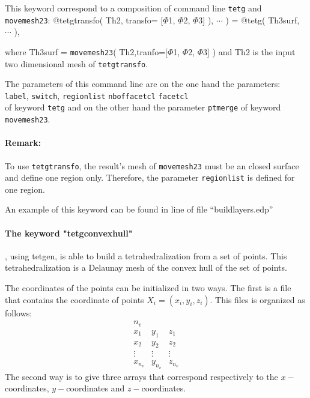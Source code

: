\documentclass[a4paper,twoside,12pt]{book}
\begin{document}
This keyword correspond to a composition of command line \texttt{tetg} and \texttt{movemesh23}:
\bFF
@tetgtransfo( Th2, transfo= [$\Phi$1, $\Phi$2, $\Phi$3] ), $\cdots$ ) = @tetg( Th3surf, $\cdots$ ),
\eFF

where Th3surf = \texttt{movemesh23}( Th2,tranfo=[$\Phi$1, $\Phi$2, $\Phi$3] ) and Th2 is the input two dimensional mesh of \texttt{tetgtransfo}.

The parameters of this command line are on the one hand the parameters: \\
\hspace*{2cm} \texttt{label}, \texttt{switch}, \texttt{regionlist} \texttt{nboffacetcl} \texttt{facetcl}\\
of keyword \texttt{tetg} and on the other hand the parameter \texttt{ptmerge} of keyword \texttt{movemesh23}.

\paragraph{Remark:} To use \texttt{tetgtransfo}, the result's mesh of \texttt{movemesh23} must be an closed surface and define one region only.
Therefore, the parameter \texttt{regionlist} is defined for one region.

An example of this keyword can be found in line  of file ``buildlayers.edp''

\paragraph{The keyword "tetgconvexhull"}

\freefempp, using tetgen, is able to build a tetrahedralization from a set of points. This
tetrahedralization is a Delaunay mesh of the convex hull of the set of points.

The coordinates of the points can be initialized in two ways. The first is a file that contains
the coordinate of points $X_{i}=(x_{i}, y_{i}, z_{i})$. This files is organized as follows:
$$
\begin{array}{ccc}
n_{v} & & \\
x_{1} & y_{1} & z_{1}  \\
x_{2} & y_{2} & z_{2} \\
\vdots &\vdots & \vdots \\
x_{n_v} & y_{n_v} & z_{n_v}
\end{array}
$$
The second way is to give three arrays that correspond respectively to the
$x-$coordinates, $y-$coordinates and $z-$coordinates.\\
\end{document}

